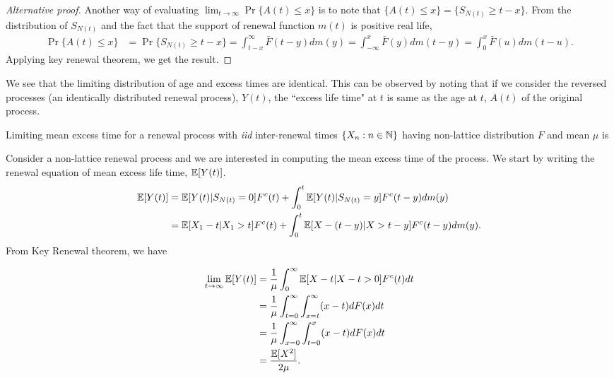 \documentclass[a4paper,10pt,english]{article}
\begin{document}
\begin{proof}[Alternative proof]
Another way of evaluating $\lim_{t\to \infty} \Pr\{A(t)\leq x\}$ is to note that $\{A(t)\leq x\} = \{S_{N(t)}\geq t-x\}$. 
From the distribution of $S_{N(t)}$ and the fact that the support of renewal function $m(t)$ is positive real life, %
\begin{align*}
\Pr\{A(t)\leq x\} &= \Pr\{S_{N(t)}\geq t-x\} %
= \int_{t-x}^{\infty}\bar{F}(t-y)dm(y) = \int_{-\infty}^{x}\bar{F}(y)dm(t-y)= \int_{0}^x \bar{F}(u)dm(t-u). 
\end{align*}
Applying key renewal theorem, we get the result.
\end{proof}
We see that the limiting distribution of age and excess times are identical. %
This can be observed by noting that if we consider the reversed processes (an identically distributed renewal process), $Y(t)$,  
the ``excess life time" at $t$ is same as the age at $t$, $A(t)$ of the original process.
\begin{cor}
Limiting mean excess time for a renewal process with \textit{iid} inter-renewal times $\{X_n: n \in \mathbb{N}\}$ having non-lattice distribution $F$ and mean $\mu$ is 
\end{cor}
Consider a non-lattice renewal process and we are interested in computing the mean excess time of the process. We start by writing the renewal equation of mean excess life time, $\mathbb{E}[Y(t)]$.
\begin{align*}
\mathbb{E}[Y(t)]&= \mathbb{E}[Y(t)|S_{N(t)}=0]F^c(t)+ \int_{0}^{t} \mathbb{E}[Y(t)|S_{N(t)}=y]F^c(t-y)dm(y)\\
&=\mathbb{E}[X_1-t |X_1>t]F^c(t)+ \int_{0}^{t} \mathbb{E}[X-(t-y)|X>t-y]F^c(t-y)dm(y).
\end{align*}
From Key Renewal theorem, we have 

\begin{align*}
\lim_{t \to \infty}\mathbb{E}[Y(t)]&=\frac{1}{\mu} \int_{0}^{\infty} \mathbb{E}[X-t|X-t >0]F^c(t) dt\\
&= \frac{1}{\mu} \int_{t=0}^{\infty} \int_{x=t}^{\infty}(x-t) dF(x) dt\\
&= \frac{1}{\mu} \int_{x=0}^{\infty} \int_{t=0}^{x}(x-t) dF(x) dt\\
&= \frac{\mathbb{E}[X^2]}{2\mu}.
\end{align*}
\end{document}

